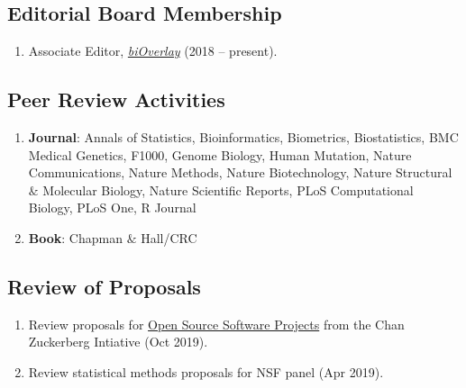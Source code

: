 \documentclass[10pt]{article}
\newcommand{\mydot}[1]{\begin{enumerate}[label=$\circ$,leftmargin=\parindent]\setlength{\itemsep}{#1}}
\newcommand{\ee}{\end{enumerate}}
\begin{document}
\subsection*{Editorial Board Membership} 

\mydot{-0.1em}

\item Associate Editor, \href{https://www.bioverlay.org}{\textit{biOverlay}} (2018 -- present).

\ee

\subsection*{Peer Review Activities} 

\mydot{-0.1em}

\item \textbf{Journal}: Annals of Statistics, Bioinformatics, Biometrics, 
Biostatistics, BMC Medical Genetics, F1000, Genome Biology, Human Mutation, 
Nature Communications, Nature Methods, Nature Biotechnology,
 Nature Structural $\&$ Molecular Biology, Nature Scientific Reports, 
 PLoS Computational Biology, PLoS One, R Journal

\item \textbf{Book}: Chapman $\&$ Hall/CRC

\ee


\subsection*{Review of Proposals}

\mydot{-0.1em}

\item Review proposals for \href{https://medium.com/@cziscience/the-invisible-foundations-of-biomedicine-4ab7f8d4f5dd}{Open Source Software Projects} from the Chan Zuckerberg Intiative (Oct 2019). 
\item Review statistical methods proposals for NSF panel (Apr 2019).

\ee


\end{document}
